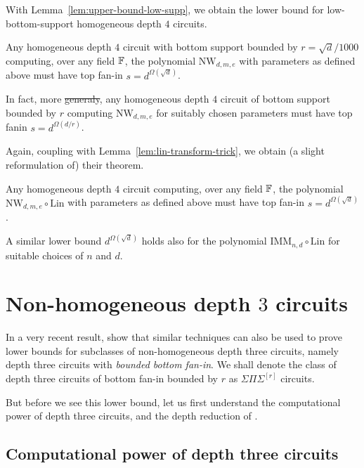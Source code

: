 \documentclass{beatcs}
\newcommand{\NW}{\mathrm{NW}}
\newcommand{\SPS}{\Sigma\Pi\Sigma}
\providecommand{\DIFaddtex}[1]{{\protect\color{blue}\uwave{#1}}} %
\providecommand{\DIFdeltex}[1]{{\protect\color{red}\sout{#1}}}                      %
\providecommand{\DIFaddbegin}{} %
\providecommand{\DIFaddend}{} %
\providecommand{\DIFdelbegin}{} %
\providecommand{\DIFdelend}{} %
\providecommand{\DIFadd}[1]{\texorpdfstring{\DIFaddtex{#1}}{#1}} %
\providecommand{\DIFdel}[1]{\texorpdfstring{\DIFdeltex{#1}}{}} %
\begin{document}
With Lemma~\ref{lem:upper-bound-low-supp}, we obtain the lower bound for low-bottom-support homogeneous depth $4$ circuits. 

\begin{theorem}[\cite{KS14}]\label{thm:IMM-lowsup-lb}
Any homogeneous depth $4$ circuit with bottom support bounded by $r = \sqrt{d}/1000$ computing, over any field $\mathbb{F}$, the polynomial $\NW_{d,m,e}$ with parameters as defined above must have top fan-in $s = d^{\Omega(\sqrt{d})}$. 

In fact, more \DIFdelbegin \DIFdel{generaly}\DIFdelend \DIFaddbegin \DIFadd{generally}\DIFaddend , any homogeneous depth $4$ circuit of bottom support bounded by $r$ computing $\NW_{d,m,e}$ for suitably chosen parameters must have top fanin $s = d^{\Omega(d/r)}$. 
\end{theorem}

Again, coupling with Lemma~\ref{lem:lin-transform-trick}, we obtain (a slight reformulation of) their theorem. 

\begin{theorem}\label{thm:IMM-lb}
Any homogeneous depth $4$ circuit computing, over any field $\mathbb{F}$,  the polynomial $\NW_{d,m,e}\circ \mathrm{Lin}$ with parameters as defined above must have top fan-in $s = d^{\Omega(\sqrt{d})}$. 

A similar lower bound $d^{\Omega(\sqrt{d})}$ holds also for the polynomial $\mathrm{IMM}_{n,d} \circ \mathrm{Lin}$ for suitable choices of $n$ and $d$. 
\end{theorem}

\section{Non-homogeneous depth $3$ circuits}\label{sec:kayalsaha}

In a very recent result, \cite{KayalSaha14} show that similar techniques can also be used to prove lower bounds for subclasses of non-homogeneous depth three circuits, namely depth three circuits with \emph{bounded bottom fan-in}. We shall denote the class of depth three circuits of bottom fan-in bounded by $r$ as $\SPS^{[r]}$ circuits. 

But before we see this lower bound, let us first understand the computational power of depth three circuits, and the depth reduction of \cite{gkks13b}. 

\subsection{Computational power of depth three circuits}
\end{document}
